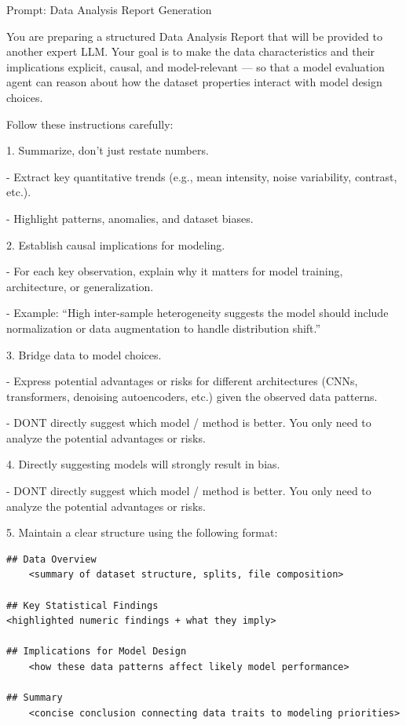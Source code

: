 \begin{promptbox}{Prompt: Data Analysis Report Generation}

You are preparing a structured Data Analysis Report that will be provided to another expert LLM. Your goal is to make the data characteristics and their implications explicit, causal, and model-relevant — so that a model evaluation agent can reason about how the dataset properties interact with model design choices.
\newline

Follow these instructions carefully:

1. Summarize, don’t just restate numbers.

    - Extract key quantitative trends (e.g., mean intensity, noise variability, contrast, etc.).

    - Highlight patterns, anomalies, and dataset biases.

2. Establish causal implications for modeling.

    - For each key observation, explain why it matters for model training, architecture, or generalization.
    
    - Example: “High inter-sample heterogeneity suggests the model should include normalization or data augmentation to handle distribution shift.”

3. Bridge data to model choices.

    - Express potential advantages or risks for different architectures (CNNs, transformers, denoising autoencoders, etc.) given the observed data patterns.
    
    - DONT directly suggest which model / method is better. You only need to analyze the potential advantages or risks.

4. Directly suggesting models will strongly result in bias.

    - DONT directly suggest which model / method is better. You only need to analyze the potential advantages or risks.

5. Maintain a clear structure using the following format:
\begin{verbatim}
## Data Overview
    <summary of dataset structure, splits, file composition>

## Key Statistical Findings
<highlighted numeric findings + what they imply>

## Implications for Model Design
    <how these data patterns affect likely model performance>

## Summary
    <concise conclusion connecting data traits to modeling priorities>
\end{verbatim}


\end{promptbox}
